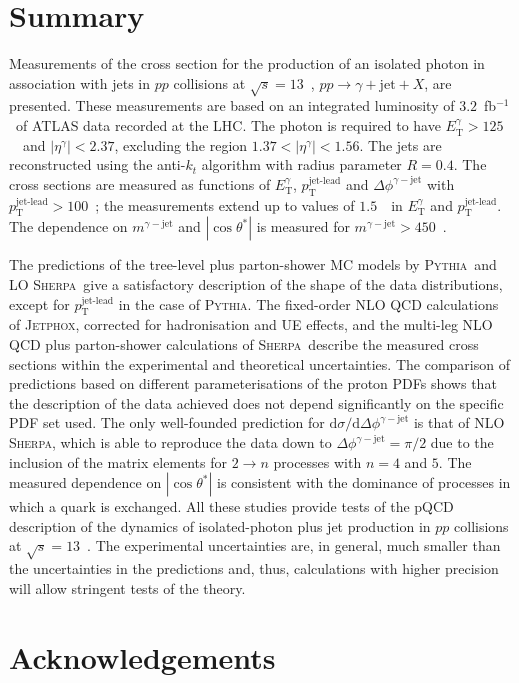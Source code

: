 \documentclass[cernpreprint,texlive=2016,txfonts,UKenglish]{latex/atlasdoc}
\def\ptjetl{p_{\mathrm{T}}^{\text{jet-lead}}}
\def\etg{E_{\mathrm{T}}^{\gamma}}
\def\etag{\eta^{\gamma}}
\def\mgj{m^{\gamma-{\mathrm{jet}}}}
\def\ctgj{\cos\theta^*}
\def\deltaphigj{\Delta\phi^{\gamma-{\mathrm{jet}}}}
\def\fb1{fb$^{-1}$}
\def\dsphi{{\mathrm{d}}\sigma/{\mathrm{d}}\deltaphigj}
\def\ppgj{pp\rightarrow\gamma + {\mathrm{jet}} + X}
\def\sher{{\textsc{Sherpa}}}
\def\pyt{{\textsc{Pythia}}}
\def\jetp{{\textsc{Jetphox}}}
\begin{document}
\section{Summary}
\label{conc}
Measurements of the cross section for the production of an isolated
photon in association with jets in $pp$ collisions at $\sqrt
s=13$~\TeV, $\ppgj$, are presented. These measurements are based on an
integrated luminosity of $3.2$~\fb1\ of ATLAS data recorded at the
LHC. The photon is required to have $\etg>125$~\GeV\ and
$|\etag|<2.37$, excluding the region $1.37<|\etag|<1.56$. The jets are
reconstructed using the anti-$k_t$ algorithm with radius parameter
$R=0.4$. The cross sections are measured as functions of $\etg$,
$\ptjetl$ and $\deltaphigj$ with $\ptjetl>100$~\GeV; the measurements
extend up to values of $1.5$~\TeV\ in $\etg$ and $\ptjetl$. The
dependence on $\mgj$ and $|\ctgj|$ is measured for $\mgj>450$~\GeV.

The predictions of the tree-level plus parton-shower MC models by
\pyt\ and LO \sher\ give a satisfactory description of the shape of
the data distributions, except for $\ptjetl$ in the case of \pyt. The
fixed-order NLO QCD calculations of \jetp, corrected for hadronisation
and UE effects, and the multi-leg NLO QCD plus parton-shower
calculations of \sher\ describe the measured cross sections within the
experimental and theoretical uncertainties. The comparison of
predictions based on different parameterisations of the proton PDFs
shows that the description of the data achieved does not depend
significantly on the specific PDF set used. The only well-founded
prediction for $\dsphi$ is that of NLO \sher, which is able to
reproduce the data down to $\deltaphigj=\pi/2$ due to the inclusion of
the matrix elements for $2\rightarrow n$ processes with $n=4$ and
$5$. The measured dependence on $|\ctgj|$ is consistent with the
dominance of processes in which a quark is exchanged. All these
studies provide tests of the pQCD description of the dynamics of
isolated-photon plus jet production in $pp$ collisions at $\sqrt
s=13$~\TeV. The experimental uncertainties are, in general, much
smaller than the uncertainties in the predictions and, thus,
calculations with higher precision will allow stringent tests of the
theory.

\section*{Acknowledgements}



\printbibliography

\newpage

\end{document}
